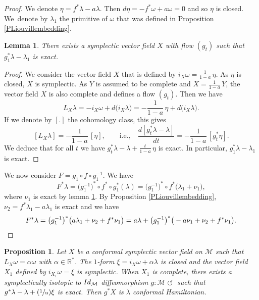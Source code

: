 \documentclass[11pt]{article}
\newcommand{\ie}{i.e.,\xspace}
\numberwithin{equation}{section}
\numberwithin{figure}{section}
\numberwithin{table}{section}
\newcommand{\Psfrac}[2]{(\sfrac{#1}{#2})}
\providecommand{\righttoleftarrow}{\mathrel{\circlearrowleft}}
\newtheorem{lemma}{Lemma}
\newtheorem{proposition}{Proposition}
\theoremstyle{definition}
\def\R{\mathbb{R}}
\def\cM{{\mathcal M}}
\begin{document}
\begin{proof}
We denote $\eta=f^*\lambda-a\lambda$. Then $d\eta=-f^*\omega+a\omega=0$ and so $\eta$ is closed. We~denote by $\lambda_1$ the primitive of $\omega$ that was defined in Proposition \ref{PLiouvillembedding}.

\begin{lemma}\label{L2}
There exists a symplectic vector field $X$ with flow $(g_t)$ such that $g_1^*\lambda-\lambda_1$ is exact.
\end{lemma}

\begin{proof}
We consider the vector field $X$ that is defined by $i_X\omega=\frac{1}{1-a}\,\eta$. As $\eta$ is closed, $X$ is symplectic. As $Y$ is assumed to be complete and $X=\frac{1}{1-a}\,Y$, the vector field $X$ is also complete and defines a flow $(g_t)$. Then we have\vspace*{-3pt}
\[
L_X\lambda=-i_X\omega+d\big(i_X\lambda\big)=-\frac{1}{1-a}\,\eta+d\big(i_X\lambda\big).
\]
If we denote by $[.]$ the cohomology class, this gives\vspace*{-3pt}
\[
[L_X\lambda]=-\frac{1}{1-a}\,[\eta],\qquad
\text{\ie}
\quad
\frac{d[g_t^*\lambda-\lambda]}{dt}=-\frac{1}{1-a}\,[g_t^*\eta].
\]
We deduce that for all $t$ we have
$g_t^*\lambda-\lambda+\frac{t}{1-a}\,\eta$ is exact. In particular, $g^*_1\lambda-\lambda_1$ is exact.
\end{proof}
We now consider $F=g_1\circ f\circ g_1^{-1}$. We have
\[
F^*\lambda=\big(g_1^{-1}\big)^*\circ f^*\circ g_1^*(\lambda)=\big(g_1^{-1}\big)^*\circ f^*\big( \lambda_1 +\nu_1\big),
\]
where $\nu_1$ is exact by lemma \ref{L2}. By Proposition \ref{PLiouvillembedding}, $\nu_2=f^*\lambda_1-a\lambda_1$ is exact and we have
\[
F^*\lambda=\big(g_1^{-1}\big)^* \big( a\lambda_1+\nu_2 + f^*\nu_1\big)=a\lambda+\big(g_1^{-1}\big)^{*}\big(-a\nu_1+\nu_2 + f^*\nu_1\big).\qedhere
\]
\end{proof}

\begin{proposition}\label{PCH}
Let $X$ be a conformal symplectic vector field on $\cM$ such that $L_X\omega=\alpha \omega$ with $\alpha\in\R^*$. The $1$-form $\xi=i_X\omega+\alpha\lambda$ is closed and the vector field $X_1$ defined by $i_{X_1}\omega=\xi$ is symplectic. When $X_1$ is complete, there exists a symplectically isotopic to ${\rm Id}_\cM$ diffeomorphism $g: \cM \righttoleftarrow$ such that $g^*\lambda-\lambda +\Psfrac{1}{\alpha}\xi$ is exact. Then $g^*X$ is $\lambda$ conformal Hamiltonian.
\end{proposition}
\end{document}
